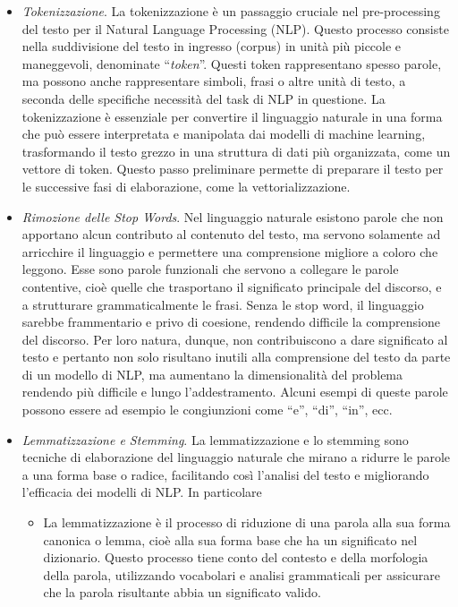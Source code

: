 \documentclass[12pt,a4paper,twoside,openright]{book}
\begin{document}
\begin{itemize}
    \item \emph{Tokenizzazione}. La tokenizzazione è un passaggio cruciale nel pre-processing del testo per il Natural Language Processing (NLP). Questo processo consiste nella suddivisione del testo in ingresso (corpus) in unità più piccole e maneggevoli, denominate ``\emph{token}''. Questi token rappresentano spesso parole, ma possono anche rappresentare simboli, frasi o altre unità di testo, a seconda delle specifiche necessità del task di NLP in questione. La tokenizzazione è essenziale per convertire il linguaggio naturale in una forma che può essere interpretata e manipolata dai modelli di machine learning, trasformando il testo grezzo in una struttura di dati più organizzata, come un vettore di token. Questo passo preliminare permette di preparare il testo per le successive fasi di elaborazione, come la vettorializzazione. 
    \item \emph{Rimozione delle Stop Words}. Nel linguaggio naturale esistono parole che non apportano alcun contributo al contenuto del testo, ma servono solamente ad arricchire il linguaggio e permettere una comprensione migliore a coloro che leggono. Esse sono parole funzionali che servono a collegare le parole contentive, cioè quelle che trasportano il significato principale del discorso, e a strutturare grammaticalmente le frasi. Senza le stop word, il linguaggio sarebbe frammentario e privo di coesione, rendendo difficile la comprensione del discorso. Per loro natura, dunque, non contribuiscono a dare significato al testo e pertanto non solo risultano inutili alla comprensione del testo da parte di un modello di NLP, ma aumentano la dimensionalità del problema rendendo più difficile e lungo l'addestramento. Alcuni esempi di queste parole possono essere ad esempio le congiunzioni come ``e'', ``di'', ``in'', ecc.  
    \item \emph{Lemmatizzazione e Stemming}. La lemmatizzazione e lo stemming sono tecniche di elaborazione del linguaggio naturale che mirano a ridurre le parole a una forma base o radice, facilitando così l'analisi del testo e migliorando l'efficacia dei modelli di NLP. In particolare 
    \begin{itemize}
        \item La lemmatizzazione è il processo di riduzione di una parola alla sua forma canonica o lemma, cioè alla sua forma base che ha un significato nel dizionario. Questo processo tiene conto del contesto e della morfologia della parola, utilizzando vocabolari e analisi grammaticali per assicurare che la parola risultante abbia un significato valido. 

\end{itemize}
\end{itemize}
\end{document}
